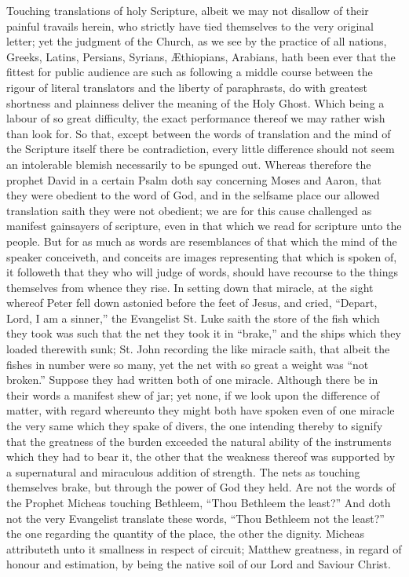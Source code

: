 Touching translations of holy Scripture, albeit we may not disallow of their painful travails herein, who strictly have tied themselves to the very original letter; yet the judgment of the Church, as we see by the practice of all nations, Greeks, Latins, Persians, Syrians, Æthiopians, Arabians, hath been ever that the fittest for public audience are such as following a middle course between the rigour of literal translators and the liberty of paraphrasts, do with greatest shortness and plainness deliver the meaning of the Holy Ghost. Which being a labour of so great difficulty, the exact performance thereof we may rather wish than look for. So that, except between the words of translation and the mind of the Scripture itself there be contradiction, every little difference should not seem an intolerable blemish necessarily to be spunged out.
Whereas therefore the prophet David in a certain  Psalm doth say concerning Moses and Aaron, that they were obedient to the word of God, and in the selfsame place our allowed translation saith they were not obedient; we are for this cause challenged as manifest gainsayers of scripture, even in that which we read for scripture unto the people. But for as much as words are resemblances of that which the mind of the speaker conceiveth, and conceits are images representing that which is spoken of, it followeth that they who will judge of words, should have recourse to the things themselves from whence they rise.
In setting down that miracle, at the sight whereof Peter fell down astonied before the feet of Jesus, and cried, “Depart, Lord, I am a sinner,” the Evangelist St. Luke saith the store of the fish which they took was such that the net they took it in “brake,” and the ships which they loaded therewith sunk; St. John recording the like miracle saith, that albeit the fishes in number were so many, yet the net with so great a weight was “not broken.” Suppose they had written both of one miracle. Although there be in their words a manifest shew of jar; yet none, if we look upon the difference of matter, with regard whereunto they might both have spoken even of one miracle the very same which they spake of divers, the one intending thereby to signify that the greatness of the burden exceeded the natural ability of the instruments which they had to bear it, the other that the weakness thereof was supported by a supernatural and miraculous addition of strength. The nets as touching themselves brake, but through the power of God they held.
Are not the words of the Prophet Micheas touching Bethleem, “Thou Bethleem the least?” And doth not the very Evangelist translate these words, “Thou Bethleem not the least?” the one regarding the quantity of the place, the other the dignity. Micheas attributeth unto it smallness in respect of circuit; Matthew greatness, in regard of honour  and estimation, by being the native soil of our Lord and Saviour Christ.
